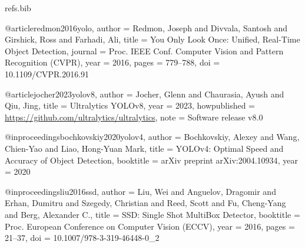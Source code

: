 %
%

\begin{filecontents*}{refs.bib}


@article{redmon2016yolo,
  author    = {Redmon, Joseph and Divvala, Santosh and Girshick, Ross and Farhadi, Ali},
  title     = {You Only Look Once: Unified, Real-Time Object Detection},
  journal   = {Proc. IEEE Conf. Computer Vision and Pattern Recognition (CVPR)},
  year      = {2016},
  pages     = {779--788},
  doi       = {10.1109/CVPR.2016.91}
}

@article{jocher2023yolov8,
  author    = {Jocher, Glenn and Chaurasia, Ayush and Qiu, Jing},
  title     = {{Ultralytics YOLOv8}},
  year      = {2023},
  howpublished = {\url{https://github.com/ultralytics/ultralytics}},
  note      = {Software release v8.0}
}

@inproceedings{bochkovskiy2020yolov4,
  author    = {Bochkovskiy, Alexey and Wang, Chien-Yao and Liao, Hong-Yuan Mark},
  title     = {{YOLOv4}: Optimal Speed and Accuracy of Object Detection},
  booktitle = {arXiv preprint arXiv:2004.10934},
  year      = {2020}
}

@inproceedings{liu2016ssd,
  author    = {Liu, Wei and Anguelov, Dragomir and Erhan, Dumitru and Szegedy, Christian and Reed, Scott and Fu, Cheng-Yang and Berg, Alexander C.},
  title     = {{SSD}: Single Shot MultiBox Detector},
  booktitle = {Proc. European Conference on Computer Vision (ECCV)},
  year      = {2016},
  pages     = {21--37},
  doi       = {10.1007/978-3-319-46448-0_2}
}


\end{filecontents*}

